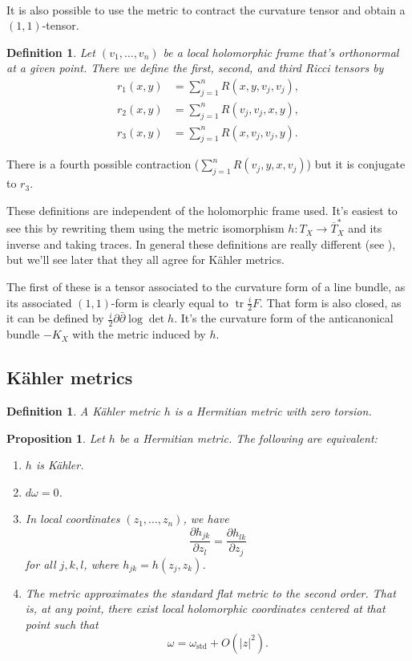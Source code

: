 \documentclass[11pt]{article}
\newtheorem{prop}[theo]{Proposition}
\newtheorem{defi}[theo]{Definition}
\DeclareMathOperator{\tr}{tr}
\begin{document}
\paragraph{}
It is also possible to use the metric to contract the curvature tensor and obtain a $(1,1)$-tensor.

\begin{defi}
  Let $(v_1, \ldots, v_n)$ be a local holomorphic frame that's orthonormal at a given point. There we define the \emph{first}, \emph{second}, and \emph{third Ricci tensors} by
\begin{align*}
r_1(x,y) &= \sum_{j=1}^n R(x,y,v_j,v_j),
\\
r_2(x,y) &= \sum_{j=1}^n R(v_j, v_j, x,y),
\\
r_3(x,y) &= \sum_{j=1}^n R(x,v_j,v_j,y).
\end{align*}
\end{defi}

There is a fourth possible contraction ($\sum_{j=1}^n R(v_j,y,x,v_j)$) but it is conjugate to $r_3$.

These definitions are independent of the holomorphic frame used. It's easiest to see this by rewriting them using the metric isomorphism $h : T_X \to \overline T_X^*$ and its inverse and taking traces. In general these definitions are really different (see ), but we'll see later that they all agree for K\"ahler metrics.

The first of these is a tensor associated to the curvature form of a line bundle, as its associated $(1,1)$-form is clearly equal to $\tr \frac i2 F$. That form is also closed, as it can be defined by $\frac i2 \partial\bar\partial \log \det h$. It's the curvature form of the anticanonical bundle $-K_X$ with the metric induced by $h$.




\subsection{K\"ahler metrics}

\begin{defi}
A \emph{K\"ahler metric} $h$ is a Hermitian metric with zero torsion.
\end{defi}


\begin{prop}
Let $h$ be a Hermitian metric. The following are equivalent:
\begin{enumerate}
\item $h$ is K\"ahler.
\item $d\omega = 0$.
\item In local coordinates $(z_1,\ldots,z_n)$, we have
\[
\frac{\partial h_{jk}}{\partial z_l}
= \frac{\partial h_{lk}}{\partial z_j}
\]
for all $j,k,l$, where $h_{jk} = h(z_j,z_k)$.
\item The metric approximates the standard flat metric to the second order. That is, at any point, there exist local holomorphic coordinates centered at that point such that
\[
\omega = \omega_{\text{std}} + O(|z|^2).
\]
\end{enumerate}
\end{prop}
\end{document}
